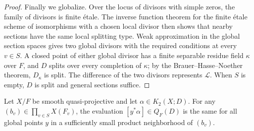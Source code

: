 \begin{proof}
Finally we globalize.
Over the locus of divisors with simple zeros, the family of divisors is finite \'etale.
The inverse function theorem for the finite \'etale scheme of isomorphisms with a chosen local divisor then shows that nearby sections have the same local splitting type.
Weak approximation in the global section spaces gives two global divisors with the required conditions at every $v\in S$.
A closed point of either global divisor has a finite separable residue field $\kappa$ over $F$, and $D$ splits over every completion of $\kappa$; by the Brauer--Hasse--Noether theorem, $D_\kappa$ is split.
The difference of the two divisors represents $\mathcal L$.
When $S$ is empty, $D$ is split and general sections suffice.
\end{proof}

\begin{lemma}\label{lem:paper-adelic-eval}
Let $X/F$ be smooth quasi-projective and let $\alpha\in K_2(X;D)$.
For any $(b_v)\in\prod_{v\in S}X(F_v)$, the evaluation $[y^*\alpha]\in Q_F(D)$ is the same for all global points $y$ in a sufficiently small product neighborhood of $(b_v)$.
\end{lemma}
